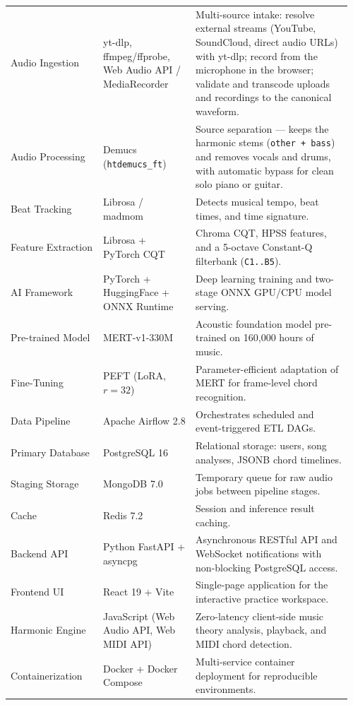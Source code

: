 \documentclass[a4paper]{article}
\begin{document}
\begin{longtable}{@{}
    >{\raggedright\arraybackslash}p{0.26\linewidth}
    >{\raggedright\arraybackslash}p{0.26\linewidth}
    >{\raggedright\arraybackslash}p{0.44\linewidth}@{}}
    Audio Ingestion & yt-dlp, ffmpeg/ffprobe, Web Audio API / MediaRecorder & Multi-source intake: resolve external streams (YouTube, SoundCloud, direct audio URLs) with yt-dlp; record from the microphone in the browser; validate and transcode uploads and recordings to the canonical waveform. \\
    \addlinespace
    Audio Processing & Demucs (\texttt{htdemucs\_ft}) & Source separation --- keeps the harmonic stems (\texttt{other + bass}) and removes vocals and drums, with automatic bypass for clean solo piano or guitar. \\
    \addlinespace
    Beat Tracking & Librosa / madmom & Detects musical tempo, beat times, and time signature. \\
    \addlinespace
    Feature Extraction & Librosa + PyTorch CQT & Chroma CQT, HPSS features, and a 5-octave Constant-Q filterbank (\texttt{C1..B5}). \\
    \addlinespace
    AI Framework & PyTorch + HuggingFace + ONNX Runtime & Deep learning training and two-stage ONNX GPU/CPU model serving. \\
    \addlinespace
    Pre-trained Model & MERT-v1-330M & Acoustic foundation model pre-trained on 160,000 hours of music. \\
    \addlinespace
    Fine-Tuning & PEFT (LoRA, $r=32$) & Parameter-efficient adaptation of MERT for frame-level chord recognition. \\
    \addlinespace
    Data Pipeline & Apache Airflow 2.8 & Orchestrates scheduled and event-triggered ETL DAGs. \\
    \addlinespace
    Primary Database & PostgreSQL 16 & Relational storage: users, song analyses, JSONB chord timelines. \\
    \addlinespace
    Staging Storage & MongoDB 7.0 & Temporary queue for raw audio jobs between pipeline stages. \\
    \addlinespace
    Cache & Redis 7.2 & Session and inference result caching. \\
    \addlinespace
    Backend API & Python FastAPI + asyncpg & Asynchronous RESTful API and WebSocket notifications with non-blocking PostgreSQL access. \\
    \addlinespace
    Frontend UI & React 19 + Vite & Single-page application for the interactive practice workspace. \\
    \addlinespace
    Harmonic Engine & JavaScript (Web Audio API, Web MIDI API) & Zero-latency client-side music theory analysis, playback, and MIDI chord detection. \\
    \addlinespace
    Containerization & Docker + Docker Compose & Multi-service container deployment for reproducible environments. \\
\end{longtable}
\end{document}
